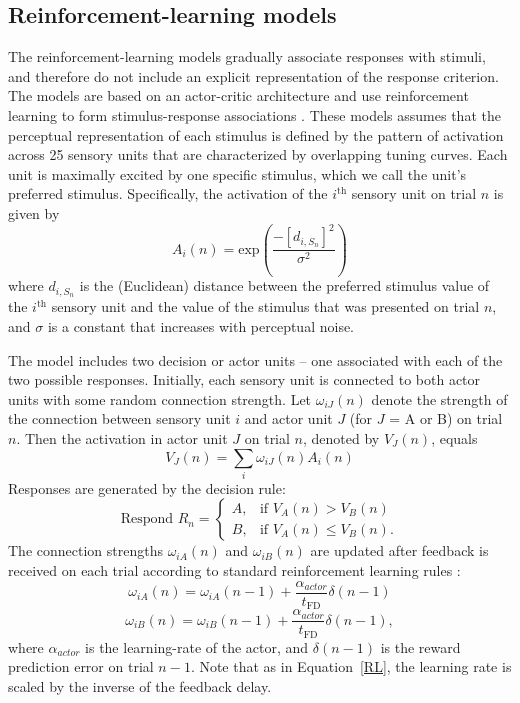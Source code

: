 \documentclass[doc, floatsintext]{apa7}
\begin{document}
\subsection{Reinforcement-learning models}
The reinforcement-learning models gradually associate
responses with stimuli, and therefore do not include an
explicit representation of the response criterion. The
models are based on an actor-critic architecture and use
reinforcement learning to form stimulus-response
associations \parencite{SuttonBarto1998}. These models
assumes that the perceptual representation of each stimulus
is defined by the pattern of activation across 25 sensory
units that are characterized by overlapping tuning curves.
Each unit is maximally excited by one specific stimulus,
which we call the unit's preferred stimulus. Specifically,
the activation of the $i^\text{th}$ sensory unit on trial
$n$ is given by
\begin{equation}
  A_i(n) = \text{exp} \left( \frac{-\left[d_{i,S_n}\right]^2}{\sigma^2} \right)
  \label{eq:DSL_activation}
\end{equation}
where $d_{i,S_n}$ is the (Euclidean) distance between the preferred
stimulus value of the $i^\text{th}$ sensory unit and the
value of the stimulus that was presented on trial $n$, and
$\sigma$ is a constant that increases with perceptual noise.

The model includes two decision or actor units -- one
associated with each of the two possible responses.
Initially, each sensory unit is connected to both actor
units with some random connection strength. Let
$\omega_{iJ}(n)$ denote the strength of the connection
between sensory unit $i$ and actor unit $J$ (for $J$ = A or
B) on trial $n$. Then the activation in actor unit $J$ on
trial $n$, denoted by $V_J(n)$, equals
\begin{equation}
  V_J(n) = \sum_{i} \omega_{iJ}(n) A_i(n)
\end{equation}
Responses are generated by the decision rule:
\begin{equation}
 \text{Respond } R_n =
  \begin{cases}
    A, & \text{if $V_A(n) > V_B(n)$}\\
    B, & \text{if $V_A(n) \leq V_B(n).$}
  \end{cases}
\end{equation}
The connection strengths $\omega_{iA}(n)$ and
$\omega_{iB}(n)$ are updated after feedback is received on
each trial according to standard reinforcement learning
rules \parencite{SuttonBarto1998}:
\begin{equation}
  \omega_{iA}(n) = \omega_{iA}(n-1) + \frac{\alpha_{actor}}{t_\text{FD}} \delta(n-1)
\end{equation}
\begin{equation}
  \omega_{iB}(n) = \omega_{iB}(n-1) + \frac{\alpha_{actor}}{t_\text{FD}} \delta(n-1),
\end{equation}
where $\alpha_{actor}$ is the learning-rate of the actor, and
$\delta(n-1)$ is the reward prediction error on trial $n-1$.
Note that as in Equation~\ref{RL}, the learning rate is
scaled by the inverse of the feedback delay. 
\end{document}
